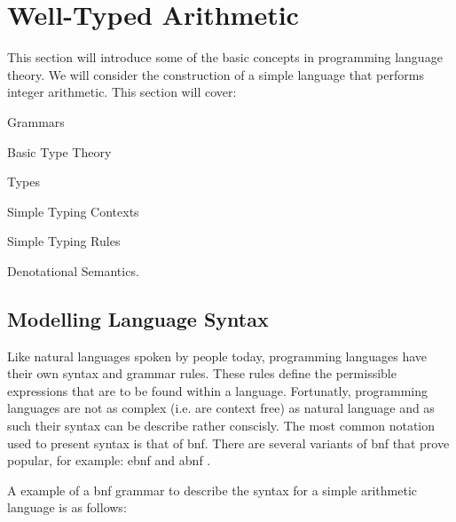 \section{Well-Typed Arithmetic}
\label{sec:typed-arith}

\noindent
This section will introduce some of the basic concepts in programming language theory.
We will consider the construction of a simple language that performs integer arithmetic.
This section will cover:

\begin{compactitem}
\item Grammars
\item Basic Type Theory
  \begin{compactitem}
  \item Types
  \item Simple Typing Contexts
  \item Simple Typing Rules
  \end{compactitem}
\item Denotational Semantics.
\end{compactitem}

\subsection{Modelling Language Syntax}
\label{sec:typed-arith:syntax}

Like natural languages spoken by people today, programming languages have their own syntax and grammar rules.
These rules define the permissible expressions that are to be found within a language.
Fortunatly, programming languages are not as complex (i.e. are context free) as natural language and as such their syntax can be describe rather conscisly.
The most common notation used to present syntax is that of \ac{bnf}.
There are several variants of \ac{bnf} that prove popular, for example: \ac{ebnf} \cite{iso14977} and \ac{abnf} \cite{rfc5234}.

A example of a \ac{bnf} grammar to describe the syntax for a simple arithmetic language is as follows:

\begin{bnf}
\\
\\
\\
\\
\\
\\
\end{bnf}

